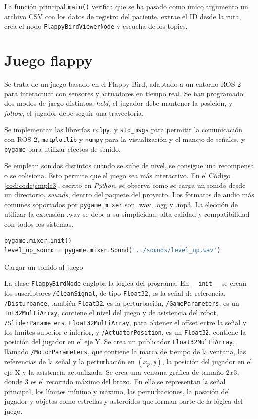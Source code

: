 La función principal \verb|main()| verifica que se ha pasado como único argumento un archivo CSV con los datos de registro del paciente, extrae el ID desde la ruta, crea el nodo \verb|FlappyBirdViewerNode| y escucha de los topics.

\section{Juego flappy}
\label{section:game}

Se trata de un juego basado en el Flappy Bird, adaptado a un entorno ROS 2 para interactuar con sensores y actuadores en tiempo real.
Se han programado dos modos de juego distintos, \textit{hold}, el jugador debe mantener la posición, y \textit{follow}, el jugador debe seguir una trayectoría.

Se implementan las librerías \verb|rclpy|, y \verb|std_msgs| para permitir la comunicación con ROS 2, \verb|matplotlib| y \verb|numpy| para la visualización y el manejo de señales, y \verb|pygame| para utilizar efectos de sonido.

Se emplean sonidos distintos cuando se sube de nivel, se consigue una recompensa o se colisiona.
Esto permite que el juego sea más interactivo.
En el Código \ref{cod:codejemplo3}, escrito en \textit{Python}, se observa como se carga un sonido desde un directorio, \textit{sounds}, dentro del paquete del proyecto.
Los formatos de audio más comunes soportados por \verb|pygame.mixer| son .wav, .ogg y .mp3.
La elección de utilizar la extensión .wav se debe a su simplicidad, alta calidad y compatibilidad con todos los sistemas.

\begin{code}[h]
\begin{lstlisting}[language=Python]
pygame.mixer.init()
level_up_sound = pygame.mixer.Sound('../sounds/level_up.wav')
\end{lstlisting}
\caption[Cargar un sonido al juego]{Cargar un sonido al juego}
\label{cod:codejemplo3}
\end{code}

La clase \verb|FlappyBirdNode| engloba la lógica del programa.
En \verb|__init__| se crean los suscriptores \verb|/CleanSignal|, de tipo \verb|Float32|, es la señal de referencia, \verb|/Disturbance|, también \verb|Float32|, es la perturbación, \verb|/GameParameters|, es un \verb|Int32MultiArray|, contiene el nivel del juego y de asistencia del robot, \verb|/SliderParameters|, \verb|Float32MultiArray|, para obtener el offset entre la señal y los límites superior e inferior, y \verb|/ActuatorPosition|, es un \verb|Float32|, contiene la posición del jugador en el eje Y.
Se crea un publicador \verb|Float32MultiArray|, llamado \verb|/MotorParameters|, que contiene la marca de tiempo de la ventana, las referencias de la señal y la perturbación en $(x_p, y)$, la posición del jugador en el eje X y la asistencia actualizada.
Se crea una ventana gráfica de tamaño $2x3$, donde 3 es el recorrido máximo del brazo.
En ella se representan la señal principal, los límites mínimo y máximo, las perturbaciones, la posición del jugador y objetos como estrellas y asteroides que forman parte de la lógica del juego.

